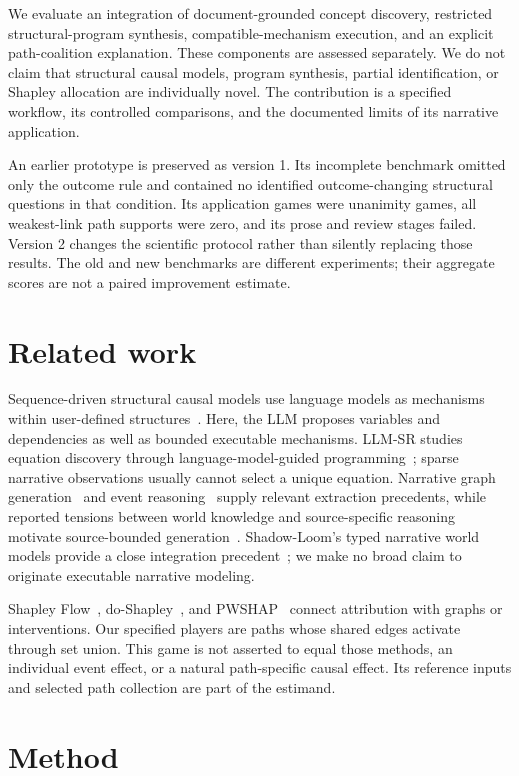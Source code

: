 \documentclass{svproc}
\begin{document}
We evaluate an integration of document-grounded concept discovery, restricted structural-program synthesis, compatible-mechanism execution, and an explicit path-coalition explanation. These components are assessed separately. We do not claim that structural causal models, program synthesis, partial identification, or Shapley allocation are individually novel. The contribution is a specified workflow, its controlled comparisons, and the documented limits of its narrative application.

An earlier prototype is preserved as version 1. Its incomplete benchmark omitted only the outcome rule and contained no identified outcome-changing structural questions in that condition. Its application games were unanimity games, all weakest-link path supports were zero, and its prose and review stages failed. Version 2 changes the scientific protocol rather than silently replacing those results. The old and new benchmarks are different experiments; their aggregate scores are not a paired improvement estimate.

\section{Related work}
Sequence-driven structural causal models use language models as mechanisms within user-defined structures~\cite{bynum}. Here, the LLM proposes variables and dependencies as well as bounded executable mechanisms. LLM-SR studies equation discovery through language-model-guided programming~\cite{shojaee}; sparse narrative observations usually cannot select a unique equation. Narrative graph generation~\cite{li} and event reasoning~\cite{koupaee} supply relevant extraction precedents, while reported tensions between world knowledge and source-specific reasoning motivate source-bounded generation~\cite{yamin}. Shadow-Loom's typed narrative world models provide a close integration precedent~\cite{wilmot}; we make no broad claim to originate executable narrative modeling.

Shapley Flow~\cite{wang}, do-Shapley~\cite{jung,witter}, and PWSHAP~\cite{terminassian} connect attribution with graphs or interventions. Our specified players are paths whose shared edges activate through set union. This game is not asserted to equal those methods, an individual event effect, or a natural path-specific causal effect. Its reference inputs and selected path collection are part of the estimand.

\section{Method}
\end{document}
